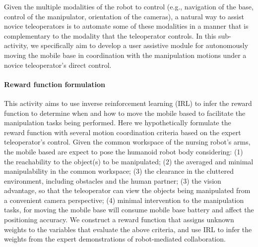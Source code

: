 \documentclass[letterpaper, 11 pt, onecolumn]{article}
\begin{document}

Given the multiple modalities of the robot to control (e.g., navigation of the base, control of the manipulator, orientation of the cameras), a natural way to assist novice teleoperators is to automate some of these modalities in a manner that is complementary to the modality that the teleoperator controls.  
In this sub-activity, we specifically aim to develop a user assistive module for autonomously moving the mobile base in coordination with the manipulation motions under a novice teleoperator's direct control. 

\paragraph*{Reward function formulation} This activity aims to use inverse reinforcement learning (IRL) to infer the reward function to determine when and how to move the mobile based to facilitate the manipulation tasks being performed. Here we hypothetically formulate the reward function with several motion coordination criteria based on the expert teleoperator's control. Given the common workspace of the nursing robot's arms,  the mobile based are expect to pose the humanoid robot body considering: (1) the reachability to the object(s) to be manipulated; (2) the averaged and minimal manipulability in the common workspace; (3) the clearance in the cluttered environment, including obstacles and the human partner; (3) the vision advantage, so that the teleoperator can view the objects being manipulated from a convenient camera perspective; (4) minimal intervention to the manipulation tasks, for moving the mobile base will consume mobile base battery and affect the positioning accuracy. We construct a reward function that assigns unknown weights to the variables that evaluate the above criteria, and use IRL to infer the weights from the expert demonstrations of robot-mediated collaboration.  
\end{document}
